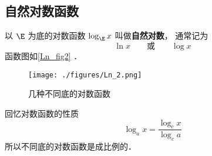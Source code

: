 
\begin{issues}
\issueDraft
\end{issues}

\subsection{自然对数函数}
以 $\E$ 为底的对数函数 $\log_{\E} x$ 叫做\textbf{自然对数}， 通常记为
\begin{equation}
\ln x \qquad \text{或} \qquad \log x
\end{equation}
函数图如\autoref{Ln_fig2} ．
\begin{figure}[ht]
\centering
\texttt{[image: ./figures/Ln\_2.png]}
\caption{几种不同底的对数函数} \label{Ln_fig2}
\end{figure}
回忆对数函数的性质
\begin{equation}
\log_a x = \frac{\log_c x}{\log_c a}
\end{equation}
所以不同底的对数函数是成比例的．